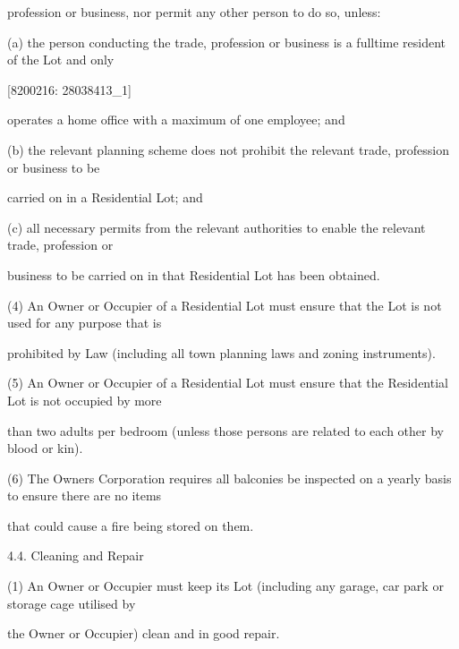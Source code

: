 \documentclass{article}
\begin{document}
{\fontsize{10.02}{1}profession or business, nor permit any other person to do so, unless: }

{\fontsize{9.962}{1}(a) the person conducting the trade, profession or business is a fulltime resident of the Lot and only }

\newpage
















{\fontsize{7.02}{1}[8200216: 28038413\_1] }

{\fontsize{10.02}{1}operates a home office with a maximum of one employee; and }

{\fontsize{9.962}{1}(b) the relevant planning scheme does not prohibit the relevant trade, profession or business to be }

{\fontsize{10.02}{1}carried on in a Residential Lot; and }

{\fontsize{9.962}{1}(c) all necessary permits from the relevant authorities to enable the relevant trade, profession or }

{\fontsize{10.02}{1}business to be carried on in that Residential Lot has been obtained. }

{\fontsize{9.962}{1}(4) An Owner or Occupier of a Residential Lot must ensure that the Lot is not used for any purpose that is }

{\fontsize{10.02}{1}prohibited by Law (including all town planning laws and zoning instruments). }

{\fontsize{9.962}{1}(5) An Owner or Occupier of a Residential Lot must ensure that the Residential Lot is not occupied by more }

{\fontsize{10.02}{1}than two adults per bedroom (unless those persons are related to each other by blood or kin). }

{\fontsize{9.962}{1}(6) The Owners Corporation requires all balconies be inspected on a yearly basis to ensure there are no items }

{\fontsize{10.02}{1}that could cause a fire being stored on them. }

{\fontsize{9.99}{1}4.4. Cleaning and Repair }

{\fontsize{9.962}{1}(1) An Owner or Occupier must keep its Lot (including any garage, car park or storage cage utilised by }

{\fontsize{10.02}{1}the Owner or Occupier) clean and in good repair. }
\end{document}

